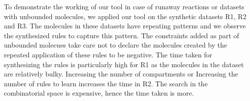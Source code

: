 \documentclass{llncs}
\begin{document}
  To demonstrate the working of our tool in case of runaway reactions or datasets with unbounded molecules, we applied our tool on the synthetic datasets R1, R2 and R3. The molecules in these datasets have repeating patterns and we observe the synthesized rules to capture this pattern. The constraints added as part of unbounded molecues take care not to declare the molecules created by the repeated application of these rules to be negative. The time taken for synthesizing the rules is particularly high for R1 as the molecules in the dataset are relatively bulky. Increasing the number of compartments or Increasing the number of rules to learn increases the time in R2. The search in the combinatorial space is expensive, hence the time taken is more. 
% 
\end{document}
